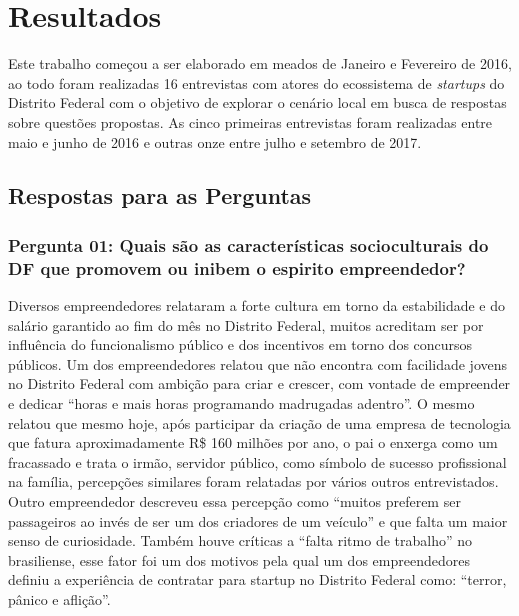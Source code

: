 \chapter[Resultados]{Resultados}
\label{cap-resultados}

Este trabalho começou a ser elaborado em meados de Janeiro e Fevereiro de 2016, ao todo foram realizadas 16 entrevistas com atores do ecossistema de \textit{startups} do Distrito Federal com o objetivo de explorar o cenário local em busca de respostas sobre questões propostas. As cinco primeiras entrevistas foram realizadas entre maio e junho de 2016 e outras onze entre julho e setembro de 2017.

\section{Respostas para as Perguntas}
\label{section:perguntas_de_pesquisa}

\subsection*{Pergunta 01: Quais são as características socioculturais do DF que promovem ou inibem o espirito empreendedor?}
\label{subsection:pergunta_de_pesquisa_1}

Diversos empreendedores relataram a forte cultura em torno da estabilidade e do salário garantido ao fim do mês no Distrito Federal, muitos acreditam ser por influência do funcionalismo público e dos incentivos em torno dos concursos públicos. Um dos empreendedores relatou que não encontra com facilidade jovens no Distrito Federal com ambição para criar e crescer, com vontade de empreender e dedicar ``horas e mais horas programando madrugadas adentro''. O mesmo relatou que mesmo hoje, após participar da criação de uma empresa de tecnologia que fatura aproximadamente R\$ 160 milhões por ano, o pai o enxerga como um fracassado e trata o irmão, servidor público, como símbolo de sucesso profissional na família, percepções similares foram relatadas por vários outros entrevistados. Outro empreendedor descreveu essa percepção como ``muitos preferem ser passageiros ao invés de ser um dos criadores de um veículo'' e que falta um maior senso de curiosidade. Também houve críticas a ``falta ritmo de trabalho'' no brasiliense, esse fator foi um dos motivos pela qual um dos empreendedores definiu a experiência de contratar para startup no Distrito Federal como: ``terror, pânico e aflição''. 

